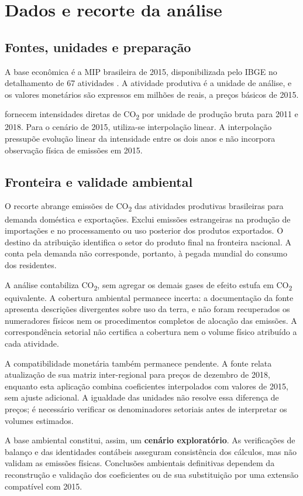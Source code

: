 \section{Dados e recorte da análise}
\label{sec:dados}

\subsection{Fontes, unidades e preparação}

A base econômica é a MIP brasileira de 2015, disponibilizada pelo IBGE no detalhamento de 67 atividades \parencite{ibge2015mip}. A atividade produtiva é a unidade de análise, e os valores monetários são expressos em milhões de reais, a preços básicos de 2015.

\textcite{sanguinetAzzoni2024} fornecem intensidades diretas de CO\textsubscript{2} por unidade de produção bruta para 2011 e 2018. Para o cenário de 2015, utiliza-se interpolação linear. A interpolação pressupõe evolução linear da intensidade entre os dois anos e não incorpora observação física de emissões em 2015.

\subsection{Fronteira e validade ambiental}

O recorte abrange emissões de CO\textsubscript{2} das atividades produtivas brasileiras para demanda doméstica e exportações. Exclui emissões estrangeiras na produção de importações e no processamento ou uso posterior dos produtos exportados. O destino da atribuição identifica o setor do produto final na fronteira nacional. A conta pela demanda não corresponde, portanto, à pegada mundial do consumo dos residentes.

A análise contabiliza CO\textsubscript{2}, sem agregar os demais gases de efeito estufa em CO\textsubscript{2} equivalente. A cobertura ambiental permanece incerta: a documentação da fonte apresenta descrições divergentes sobre uso da terra, e não foram recuperados os numeradores físicos nem os procedimentos completos de alocação das emissões. A correspondência setorial não certifica a cobertura nem o volume físico atribuído a cada atividade.

A compatibilidade monetária também permanece pendente. A fonte relata atualização de sua matriz inter-regional para preços de dezembro de 2018, enquanto esta aplicação combina coeficientes interpolados com valores de 2015, sem ajuste adicional. A igualdade das unidades não resolve essa diferença de preços; é necessário verificar os denominadores setoriais antes de interpretar os volumes estimados.

A base ambiental constitui, assim, um \textbf{cenário exploratório}. As verificações de balanço e das identidades contábeis asseguram consistência dos cálculos, mas não validam as emissões físicas. Conclusões ambientais definitivas dependem da reconstrução e validação dos coeficientes ou de sua substituição por uma extensão compatível com 2015.
